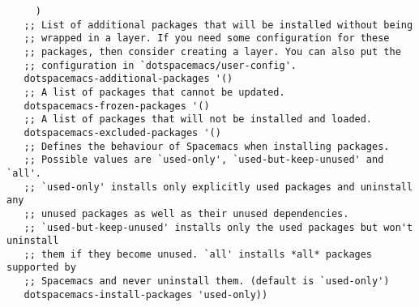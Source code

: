 \documentclass[11pt]{article}
\begin{document}
\begin{verbatim}
     )
   ;; List of additional packages that will be installed without being
   ;; wrapped in a layer. If you need some configuration for these
   ;; packages, then consider creating a layer. You can also put the
   ;; configuration in `dotspacemacs/user-config'.
   dotspacemacs-additional-packages '()
   ;; A list of packages that cannot be updated.
   dotspacemacs-frozen-packages '()
   ;; A list of packages that will not be installed and loaded.
   dotspacemacs-excluded-packages '()
   ;; Defines the behaviour of Spacemacs when installing packages.
   ;; Possible values are `used-only', `used-but-keep-unused' and `all'.
   ;; `used-only' installs only explicitly used packages and uninstall any
   ;; unused packages as well as their unused dependencies.
   ;; `used-but-keep-unused' installs only the used packages but won't uninstall
   ;; them if they become unused. `all' installs *all* packages supported by
   ;; Spacemacs and never uninstall them. (default is `used-only')
   dotspacemacs-install-packages 'used-only))


\end{verbatim}
\end{document}
